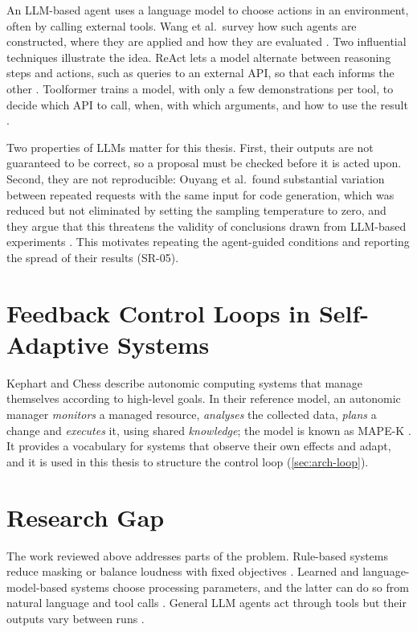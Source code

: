 An \ac{LLM}-based agent uses a language model to choose actions in an environment, often by calling external tools. Wang et al.\ survey how such agents are constructed, where they are applied and how they are evaluated \cite{Wang2024AgentSurvey}. Two influential techniques illustrate the idea. ReAct lets a model alternate between reasoning steps and actions, such as queries to an external \ac{API}, so that each informs the other \cite{Yao2023ReAct}. Toolformer trains a model, with only a few demonstrations per tool, to decide which \ac{API} to call, when, with which arguments, and how to use the result \cite{Schick2023Toolformer}.

Two properties of \acsp{LLM} matter for this thesis. First, their outputs are not guaranteed to be correct, so a proposal must be checked before it is acted upon. Second, they are not reproducible: Ouyang et al.\ found substantial variation between repeated requests with the same input for code generation, which was reduced but not eliminated by setting the sampling temperature to zero, and they argue that this threatens the validity of conclusions drawn from \ac{LLM}-based experiments \cite{Ouyang2023Nondeterminism}. This motivates repeating the agent-guided conditions and reporting the spread of their results (SR-05).

\section{Feedback Control Loops in Self-Adaptive Systems}
\label{sec:bg-mapek}

Kephart and Chess describe autonomic computing systems that manage themselves according to high-level goals. In their reference model, an autonomic manager \emph{monitors} a managed resource, \emph{analyses} the collected data, \emph{plans} a change and \emph{executes} it, using shared \emph{knowledge}; the model is known as \ac{MAPE-K} \cite{Kephart2003}. It provides a vocabulary for systems that observe their own effects and adapt, and it is used in this thesis to structure the control loop (\autoref{sec:arch-loop}).

\section{Research Gap}
\label{sec:bg-gap}

The work reviewed above addresses parts of the problem. Rule-based systems reduce masking or balance loudness with fixed objectives \cite{PerezGonzalez2009EQ, Hafezi2015}. Learned and language-model-based systems choose processing parameters, and the latter can do so from natural language and tool calls \cite{Steinmetz2021, Doh2025LLM2Fx, Doh2026LLM2FxTools}. General \ac{LLM} agents act through tools but their outputs vary between runs \cite{Yao2023ReAct, Schick2023Toolformer, Ouyang2023Nondeterminism}.

